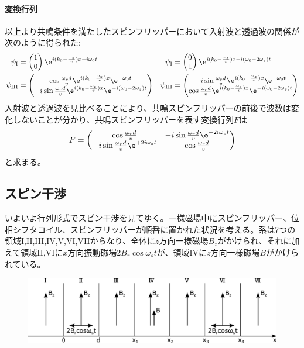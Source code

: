 \paragraph{変換行列}
以上より共鳴条件を満たしたスピンフリッパーにおいて入射波と透過波の関係が次のように得られた:
\begin{align}
\psi_\mathrm{I}&= \begin{pmatrix} 1\\0 \end{pmatrix} \e^{i (k_0-\frac{\omega_z}{v}) x -i\omega_0 t} &\psi_\mathrm{I}&= \begin{pmatrix} 0\\1 \end{pmatrix} \e^{i (k_0-\frac{\omega_z}{v}) x -i(\omega_0-2\omega_z) t}\\
\psi_\mathrm{III}&=\begin{pmatrix} \cos \frac{\omega_r d}{v} \e^{i(k_0-\frac{\omega_z}{v})x}\e^{-\omega_0t} \\ -i\sin\frac{\omega_r d}{v} \e^{i(k_0-\frac{\omega_z}{v})x}\e^{-i(\omega_0-2\omega_z)t} \end{pmatrix} &\psi_\mathrm{III}&=\begin{pmatrix} -i\sin\frac{\omega_rd}{v} \e^{i(k_0-\frac{\omega_z}{v})x}\e^{-\omega_0t} \\ \cos \frac{\omega_r d}{v} \e^{i(k_0-\frac{\omega_z}{v})x}\e^{-i(\omega_0-2\omega_z)t} \end{pmatrix}
\end{align}
入射波と透過波を見比べることにより、共鳴スピンフリッパーの前後で波数は変化しないことが分かり、共鳴スピンフリッパーを表す変換行列$F$は
\begin{equation}
F=\begin{pmatrix} \cos \frac{\omega_r d}{v} &-i\sin\frac{\omega_rd}{v}\e^{-2i\omega_zt} \\ -i\sin\frac{\omega_rd}{v}\e^{+2i\omega_zt} &\cos \frac{\omega_r d}{v}\end{pmatrix}
\end{equation}
と求まる。

\subsection{スピン干渉}
いよいよ行列形式でスピン干渉を見てゆく。一様磁場中にスピンフリッパー、位相シフタコイル、スピンフリッパーが順番に置かれた状況を考える。系は7つの領域I,II,III,IV,V,VI,VIIからなり、全体に$z$方向一様磁場$B_z$がかけられ、それに加えて領域II,VIに$x$方向振動磁場$2B_r\cos\omega_s t$が、領域IVに$z$方向一様磁場$B$がかけられている。
\begin{figure}[H]
\centering
\includegraphics[height=3cm]{matrix/interference.pdf}
\end{figure}

